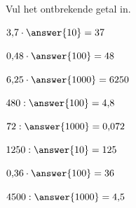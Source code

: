 \documentclass{ximera}
\begin{document}

\begin{oefening}{\oefU}

Vul het ontbrekende getal in.

\begin{question} \(3{,}7\cdot\answer{10}=37\) \end{question}

\begin{question} \(0{,}48\cdot\answer{100}=48\) \end{question}

\begin{question} \(6{,}25\cdot\answer{1000}=6250\) \end{question}

\begin{question} \(480:\answer{100}=4{,}8\) \end{question}

\begin{question} \(72:\answer{1000}=0{,}072\) \end{question}

\begin{question} \(1250:\answer{10}=125\) \end{question}

\begin{question} \(0{,}36\cdot\answer{100}=36\) \end{question}

\begin{question} \(4500:\answer{1000}=4{,}5\) \end{question}

\end{oefening}


\end{document}
